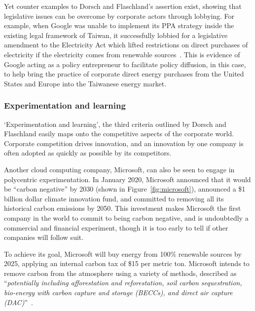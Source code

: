Yet counter examples to Dorsch and Flaschland's assertion exist,
showing that legislative issues can be overcome by corporate actors
through lobbying. For example, when Google was unable to implement its
PPA strategy inside the existing legal framework of Taiwan, it
successfully lobbied for a legislative amendment to the Electricity
Act which lifted restrictions on direct purchases of electricity if
the electricity comes from renewable sources~\citep{taiwan}. This is
evidence of Google acting as a policy entrepreneur to facilitate
policy diffusion, in this case, to help bring the practice of
corporate direct energy purchases from the United States and Europe
into the Taiwanese energy market.

\subsubsection{Experimentation and learning}

`Experimentation and learning', the third criteria outlined by Dorsch
and Flaschland easily maps onto the competitive aspects of the
corporate world. Corporate competition drives innovation, and an
innovation by one company is often adopted as quickly as possible by
its competitors.


Another cloud computing company, Microsoft, can also be seen to engage
in polycentric experimentation. In January 2020, Microsoft announced
that it would be ``carbon negative'' by 2030 (shown in
Figure~\ref{fig:microsoft}), announced a \$1 billion dollar climate
innovation fund, and committed to removing all its historical carbon
emissions by 2050. This investment makes Microsoft the first company
in the world to commit to being carbon negative, and is undoubtedly a
commercial and financial experiment, though it is too early to tell if
other companies will follow suit.

To achieve its goal, Microsoft will buy energy from 100\% renewable
sources by 2025, applying an internal carbon tax of \$15 per metric
ton. Microsoft intends to remove carbon from the atmosphere using a
variety of methods, described as ``\textit{potentially including
  afforestation and reforestation, soil carbon sequestration,
  bio-energy with carbon capture and storage (BECCs), and direct air
  capture (DAC)}''~\citep{microsoft}.

